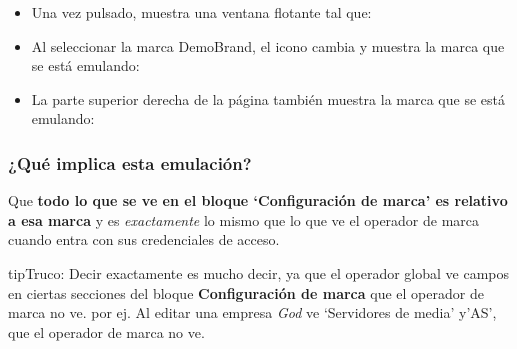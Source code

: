 \documentclass[letterpaper,10pt,spanish]{sphinxmanual}
\begin{document}
\begin{itemize}
\item {} 
Una vez pulsado, muestra una ventana flotante tal que:

\end{itemize}

\begin{itemize}
\item {} 
Al seleccionar la marca DemoBrand, el icono cambia y muestra la marca que se está emulando:

\end{itemize}

\begin{itemize}
\item {} 
La parte superior derecha de la página también muestra la marca que se está emulando:

\end{itemize}



\subsubsection{¿Qué implica esta emulación?}
\label{internal_calls/god_portal:what-emulation-means}
Que \textbf{todo lo que se ve en el bloque `Configuración de marca' es relativo a esa marca} y es \emph{exactamente} lo mismo que lo que ve el operador de marca cuando entra con sus credenciales de acceso.

\begin{notice}{tip}{Truco:}
Decir exactamente es mucho decir, ya que el operador global ve campos en ciertas secciones del bloque \textbf{Configuración de marca} que el operador de marca no ve. por ej. Al editar una empresa \emph{God} ve `Servidores de media' y'AS', que el operador de marca no ve.
\end{notice}
\end{document}
